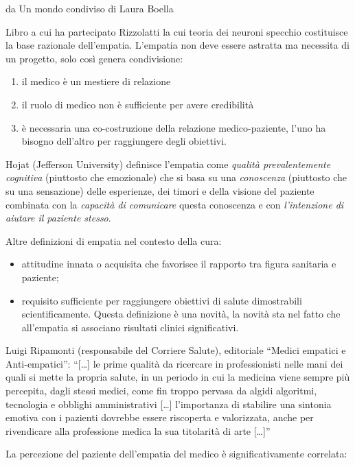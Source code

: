 \documentclass[]{article}
\begin{document}
da Un mondo condiviso di Laura Boella

Libro a cui ha partecipato Rizzolatti la cui teoria dei neuroni specchio
costituisce la base razionale dell'empatia. L'empatia non deve essere
astratta ma necessita di un progetto, solo così genera condivisione:

\begin{enumerate}
\def\labelenumi{\arabic{enumi}.}
\item
  il medico è un mestiere di relazione
\item
  il ruolo di medico non è sufficiente per avere credibilità
\item
  è necessaria una co-costruzione della relazione medico-paziente, l'uno
  ha bisogno dell'altro per raggiungere degli obiettivi.
\end{enumerate}

Hojat (Jefferson University) definisce l'empatia come \emph{qualità
prevalentemente cognitiva} (piuttosto che emozionale) che si basa su una
\emph{conoscenza} (piuttosto che su una sensazione) delle esperienze,
dei timori e della visione del paziente combinata con la \emph{capacità
di comunicare} questa conoscenza e con \emph{l'intenzione di aiutare il
paziente stesso}.

Altre definizioni di empatia nel contesto della cura:

\begin{itemize}
\item
  attitudine innata o acquisita che favorisce il rapporto tra figura
  sanitaria e paziente;
\item
  requisito sufficiente per raggiungere obiettivi di salute dimostrabili
  scientificamente. Questa definizione è una novità, la novità sta nel
  fatto che all'empatia si associano risultati clinici significativi.
\end{itemize}

Luigi Ripamonti (responsabile del Corriere Salute), editoriale ``Medici
empatici e Anti-empatici'': ``{[}\ldots{}{]} le prime qualità da
ricercare in professionisti nelle mani dei quali si mette la propria
salute, in un periodo in cui la medicina viene sempre più percepita,
dagli stessi medici, come fin troppo pervasa da algidi algoritmi,
tecnologia e obblighi amministrativi {[}\ldots{}{]} l'importanza di
stabilire una sintonia emotiva con i pazienti dovrebbe essere riscoperta
e valorizzata, anche per rivendicare alla professione medica la sua
titolarità di arte {[}\ldots{}{]}''

La percezione del paziente dell'empatia del medico è significativamente
correlata:
\end{document}

